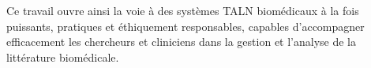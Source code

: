 \documentclass[12pt]{report}
\begin{document}
Ce travail ouvre ainsi la voie à des systèmes TALN biomédicaux à la fois puissants, pratiques et éthiquement responsables, capables d’accompagner efficacement les chercheurs et cliniciens dans la gestion et l’analyse de la littérature biomédicale.
\end{document}
